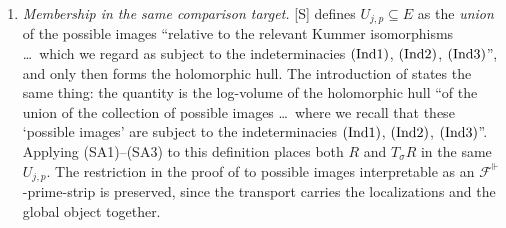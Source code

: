 \documentclass[11pt]{article}
\theoremstyle{plain}
\theoremstyle{definition}
\newcommand{\Ind}[1]{\textup{(Ind#1)}}
\begin{document}
\begin{enumerate}[label=\textbf{(SA\arabic*)},leftmargin=3.2em]
  local and global realizations \emph{together}.  In particular one does not move
  coefficients alone, nor recombine components of distinct tuples.
\item \emph{Membership in the same comparison target.}  [S]
  \cite[Corollary 3.12]{IUT3} defines $U_{j,p}\subseteq E$ as the \emph{union} of
  the possible images ``relative to the relevant Kummer isomorphisms \ldots\
  which we regard as subject to the indeterminacies $\Ind1$, $\Ind2$, $\Ind3$'',
  and only then forms the holomorphic hull.  The introduction of \cite{IUT3}
  states the same thing: the quantity is the log-volume of the holomorphic hull
  ``of the union of the collection of possible images \ldots\ where we recall
  that these `possible images' are subject to the indeterminacies $\Ind1$,
  $\Ind2$, $\Ind3$''.  Applying (SA1)--(SA3) to this definition places both $R$
  and $T_\sigma R$ in the same $U_{j,p}$.  The restriction in the proof of
  \cite[Corollary 3.12]{IUT3} to possible images interpretable as an
  $\mathcal{F}^\Vdash$-prime-strip is preserved, since the transport carries the
  localizations and the global object together.
\end{enumerate}
\end{document}
